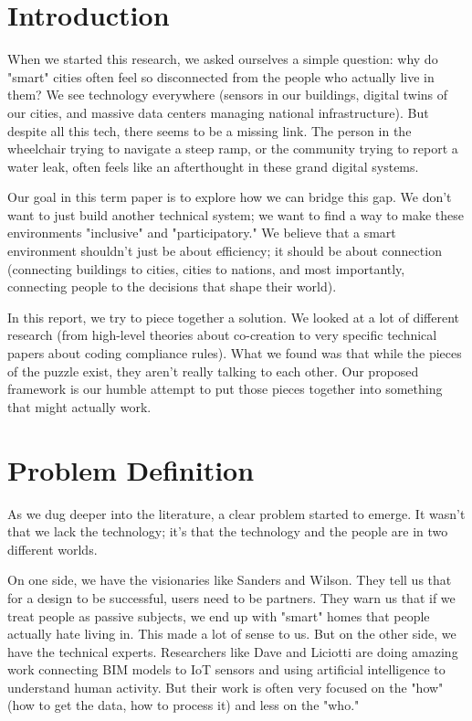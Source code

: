 \documentclass[a4paper,oneside,12pt]{report}
\begin{document}
\chapter{Introduction}

When we started this research, we asked ourselves a simple question: why do "smart" cities often feel so disconnected from the people who actually live in them? We see technology everywhere (sensors in our buildings, digital twins of our cities, and massive data centers managing national infrastructure). But despite all this tech, there seems to be a missing link. The person in the wheelchair trying to navigate a steep ramp, or the community trying to report a water leak, often feels like an afterthought in these grand digital systems.

Our goal in this term paper is to explore how we can bridge this gap. We don't want to just build another technical system; we want to find a way to make these environments "inclusive" and "participatory." We believe that a smart environment shouldn't just be about efficiency; it should be about connection (connecting buildings to cities, cities to nations, and most importantly, connecting people to the decisions that shape their world).

In this report, we try to piece together a solution. We looked at a lot of different research (from high-level theories about co-creation to very specific technical papers about coding compliance rules). What we found was that while the pieces of the puzzle exist, they aren't really talking to each other. Our proposed framework is our humble attempt to put those pieces together into something that might actually work.

\chapter{Problem Definition}

As we dug deeper into the literature, a clear problem started to emerge. It wasn't that we lack the technology; it's that the technology and the people are in two different worlds.

On one side, we have the visionaries like Sanders\cite{Sanders2008} and Wilson\cite{Wilson2015}. They tell us that for a design to be successful, users need to be partners. They warn us that if we treat people as passive subjects, we end up with "smart" homes that people actually hate living in. This made a lot of sense to us. But on the other side, we have the technical experts. Researchers like Dave\cite{Dave2018} and Liciotti\cite{Liciotti2020} are doing amazing work connecting BIM models to IoT sensors and using artificial intelligence to understand human activity. But their work is often very focused on the "how" (how to get the data, how to process it) and less on the "who."
\end{document}
